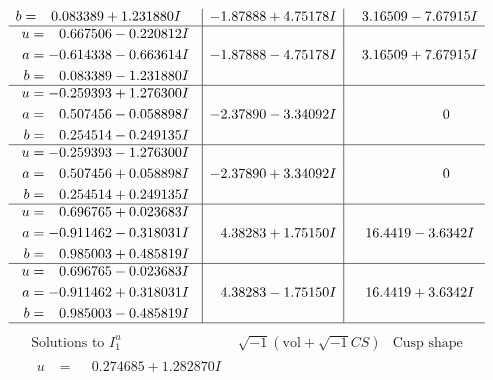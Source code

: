 \documentclass[1p]{elsarticle_modified}
\theoremstyle{definition}
\newcommand{\I}{\sqrt{-1}}
\begin{document}
$$\begin{array}{c|c|c}
\begin{aligned}
b &= \phantom{-}0.083389 + 1.231880 I\end{aligned}
 & -1.87888 + 4.75178 I & \phantom{-}3.16509 - 7.67915 I \\ \hline\begin{aligned}
u &= \phantom{-}0.667506 - 0.220812 I \\
a &= -0.614338 - 0.663614 I \\
b &= \phantom{-}0.083389 - 1.231880 I\end{aligned}
 & -1.87888 - 4.75178 I & \phantom{-}3.16509 + 7.67915 I \\ \hline\begin{aligned}
u &= -0.259393 + 1.276300 I \\
a &= \phantom{-}0.507456 - 0.058898 I \\
b &= \phantom{-}0.254514 - 0.249135 I\end{aligned}
 & -2.37890 - 3.34092 I & \phantom{-0.000000 } 0 \\ \hline\begin{aligned}
u &= -0.259393 - 1.276300 I \\
a &= \phantom{-}0.507456 + 0.058898 I \\
b &= \phantom{-}0.254514 + 0.249135 I\end{aligned}
 & -2.37890 + 3.34092 I & \phantom{-0.000000 } 0 \\ \hline\begin{aligned}
u &= \phantom{-}0.696765 + 0.023683 I \\
a &= -0.911462 - 0.318031 I \\
b &= \phantom{-}0.985003 + 0.485819 I\end{aligned}
 & \phantom{-}4.38283 + 1.75150 I & \phantom{-}16.4419 - 3.6342 I \\ \hline\begin{aligned}
u &= \phantom{-}0.696765 - 0.023683 I \\
a &= -0.911462 + 0.318031 I \\
b &= \phantom{-}0.985003 - 0.485819 I\end{aligned}
 & \phantom{-}4.38283 - 1.75150 I & \phantom{-}16.4419 + 3.6342 I\\
 \hline 
 \end{array}$$\newpage$$\begin{array}{c|c|c}  
\text{Solutions to }I^u_{1}& \I (\text{vol} + \sqrt{-1}CS) & \text{Cusp shape}\\
 \hline 
\begin{aligned}
u &= \phantom{-}0.274685 + 1.282870 I \\

\end{aligned}
\end{array}$$
\end{document}
